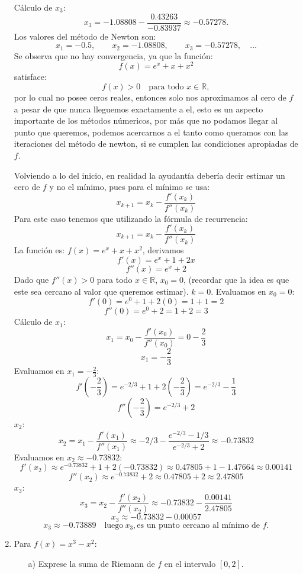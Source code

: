 \documentclass[letterpaper,12pt]{article}
\theoremstyle{plain}
\theoremstyle{definition}
\begin{document}
\begin{enumerate}
Cálculo de \(x_3\):
\[
x_3 = -1.08808 - \frac{0.43263}{-0.83937}
     \approx -0.57278.
\]
Los valores del método de Newton son:
\[
x_1 = -0.5, \qquad
x_2 = -1.08808, \qquad
x_3 = -0.57278, \quad \ldots
\]
Se observa que no hay convergencia, ya que la función:
\[
f(x) = e^x + x + x^2
\]
satisface:
\[
f(x) > 0 \quad \text{para todo } x \in \mathbb{R},
\]
por lo cual no posee ceros reales, entonces solo nos aproximamos al cero de $f$ a pesar de que nunca lleguemos exactamente a el, esto es un aspecto importante de los métodos númericos, por más que no podamos llegar al punto que queremos, podemos acercarnos a el tanto como queramos con las iteraciones del método de newton, si se cumplen las condiciones apropiadas de $f$.

Volviendo a lo del inicio, en realidad la ayudantía debería decir estimar un cero de $f$ y no el mínimo, pues para el mínimo se usa:
$$
x_{k+1} = x_k - \frac{f'(x_k)}{f''(x_k)}
$$
Para este caso tenemos que utilizando la fórmula de recurrencia:
$$x_{k+1} = x_k - \frac{f'(x_k)}{f''(x_k)}$$ La función es: $f(x) = e^x + x + x^2$, derivamos
    $$f'(x) = e^x + 1 + 2x$$
    $$f''(x) = e^x + 2$$
Dado que $f''(x) > 0$ para todo $x \in \mathbb{R}$, $x_0 = 0$, (recordar que la idea es que este sea cercano al valor que queremos estimar).
$k=0$.
Evaluamos en $x_0 = 0$:
$$f'(0) = e^0 + 1 + 2(0) = 1 + 1 = 2$$
$$f''(0) = e^0 + 2 = 1 + 2 = 3$$
Cálculo de $x_1$:
$$x_1 = x_0 - \frac{f'(x_0)}{f''(x_0)} = 0 - \frac{2}{3}$$
$$x_1 = -\frac{2}{3}$$
Evaluamos en $x_1 = -\frac{2}{3}$:
$$f'\left(-\frac{2}{3}\right) = e^{-2/3} + 1 + 2\left(-\frac{2}{3}\right) = e^{-2/3} - \frac{1}{3}$$
$$f''\left(-\frac{2}{3}\right) = e^{-2/3} + 2$$
$x_2$:
$$x_2 = x_1 - \frac{f'(x_1)}{f''(x_1)} \approx -2/3 - \frac{e^{-2/3} - 1/3}{e^{-2/3} + 2}\approx -0.73832$$
Evaluamos en $x_2 \approx -0.73832$:
$$f'(x_2) \approx e^{-0.73832} + 1 + 2(-0.73832) \approx 0.47805 + 1 - 1.47664 \approx 0.00141$$
$$f''(x_2) \approx e^{-0.73832} + 2 \approx 0.47805 + 2 \approx 2.47805$$
$x_3$:
$$x_3 = x_2 - \frac{f'(x_2)}{f''(x_2)} \approx -0.73832 - \frac{0.00141}{2.47805}$$
$$x_3 \approx -0.73832 - 0.00057$$
$$x_3 \approx -0.73889 \quad \text{luego} \ x_3, \text{es un punto cercano al mínimo de }f.$$
\color{black}

\item Para $f(x) = x^3 - x^2$:
    \begin{itemize}
        \item[a)] Exprese la suma de Riemann de $f$ en el intervalo $[0, 2]$.


\end{itemize}
\end{enumerate}
\end{document}
